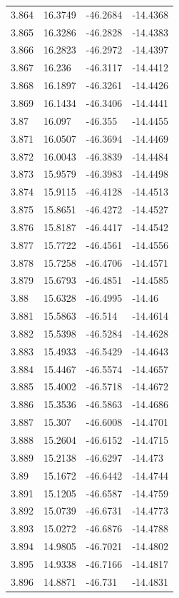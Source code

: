 \begin{tabular}{llll}
3.864 & 16.3749 & -46.2684 & -14.4368 \\
3.865 & 16.3286 & -46.2828 & -14.4383 \\
3.866 & 16.2823 & -46.2972 & -14.4397 \\
3.867 & 16.236 & -46.3117 & -14.4412 \\
3.868 & 16.1897 & -46.3261 & -14.4426 \\
3.869 & 16.1434 & -46.3406 & -14.4441 \\
3.87 & 16.097 & -46.355 & -14.4455 \\
3.871 & 16.0507 & -46.3694 & -14.4469 \\
3.872 & 16.0043 & -46.3839 & -14.4484 \\
3.873 & 15.9579 & -46.3983 & -14.4498 \\
3.874 & 15.9115 & -46.4128 & -14.4513 \\
3.875 & 15.8651 & -46.4272 & -14.4527 \\
3.876 & 15.8187 & -46.4417 & -14.4542 \\
3.877 & 15.7722 & -46.4561 & -14.4556 \\
3.878 & 15.7258 & -46.4706 & -14.4571 \\
3.879 & 15.6793 & -46.4851 & -14.4585 \\
3.88 & 15.6328 & -46.4995 & -14.46 \\
3.881 & 15.5863 & -46.514 & -14.4614 \\
3.882 & 15.5398 & -46.5284 & -14.4628 \\
3.883 & 15.4933 & -46.5429 & -14.4643 \\
3.884 & 15.4467 & -46.5574 & -14.4657 \\
3.885 & 15.4002 & -46.5718 & -14.4672 \\
3.886 & 15.3536 & -46.5863 & -14.4686 \\
3.887 & 15.307 & -46.6008 & -14.4701 \\
3.888 & 15.2604 & -46.6152 & -14.4715 \\
3.889 & 15.2138 & -46.6297 & -14.473 \\
3.89 & 15.1672 & -46.6442 & -14.4744 \\
3.891 & 15.1205 & -46.6587 & -14.4759 \\
3.892 & 15.0739 & -46.6731 & -14.4773 \\
3.893 & 15.0272 & -46.6876 & -14.4788 \\
3.894 & 14.9805 & -46.7021 & -14.4802 \\
3.895 & 14.9338 & -46.7166 & -14.4817 \\
3.896 & 14.8871 & -46.731 & -14.4831 \\

\end{tabular}
